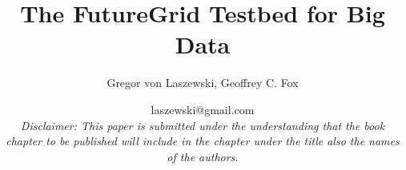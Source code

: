 \documentclass[graybox]{svmult}
\makeatletter
\newcommand{\TITLE}{The FutureGrid Testbed for Big Data}
\newcommand{\AUTHOR}{Gregor von Laszewski, Geoffrey C. Fox}
\newcommand{\EMAIL}{laszewski@gmail.com}
\newcommand{\DISCLAIMER}{{\em\footnotesize Disclaimer: This paper is submitted under the understanding that the book chapter to be published will include in the chapter under the title also the names of the authors.}}
\makeatother
\begin{document}
\title*{\TITLE}
\author{\AUTHOR}
\date{\EMAIL\\\DISCLAIMER}


















\maketitle



\newcommand{\ABSTRACT}{In this chapter we will be introducing you to FutureGrid, which provides a testbed to conduct research for Cloud, Grid, and High Performance Computing. Although FutureGrid has only a modest number of compute cores (about 4500 regular cores and 14000 GPU cores) it provides an ideal playground to test out various frameworks that may be useful for users to consider as part of their big data analysis pipelines. We will be focusing here on the use of FutureGrid for big data related testbed research.
%
The chapter is structured as follows. First we will provide the reader with an introduction to FutureGrid hardware (Section \ref{S:overview}).   Next we will focus on a selected number of services and tools that have been proven to be useful to conduct big data research on FutureGrid (Section \ref{S:services}). We will contrast frameworks such as MPI, virtual large memory systems, Infrastructure as a Service and map/reduce frameworks. Next we will present reasoning by analyzing requests to use certain technologies and identify trends within the user community to direct effort in FutureGrid (Section \ref{S:usage}). The next section will report on our experience with the integration of our software and systems teams via DevOps (Section \ref{S:devops}). Next we summarize Cloudmesh, which is a logical continuation of the FutureGrid architecture. It  provides abilities to federate cloud services and to conduct cloud shifting; that is to assign servers on-demand to HPC and Cloud services (Section \ref{S:cloudmesh}). We conclude the chapter with a brief summary (Section \ref{S:summary}).
}
\end{document}
